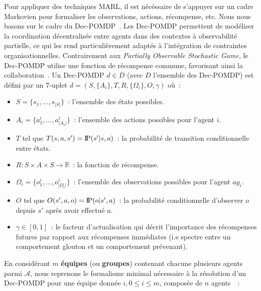 \documentclass[francais,ROIA,Unicode,manuscript]{cedram}
\newcommand{\probP}{\text{I\kern-0.15em P}}
\begin{document}
Pour appliquer des techniques MARL, il est nécéssaire de s'appuyer sur un cadre Markovien pour formaliser les observations, actions, récompense, etc. Nous nous basons sur le cadre du Dec-POMDP~\cite{Oliehoek2016}. Les Dec-POMDP permettent de modéliser la coordination décentralisée entre agents dans des contextes à observabilité partielle, ce qui les rend particulièrement adaptés à l'intégration de contraintes organisationnelles. Contrairement aux \textit{Partially Observable Stochastic Game}, le Dec-POMDP utilise une fonction de récompense commune, favorisant ainsi la collaboration~\cite{Beynier2013}.
Un Dec-POMDP $d \in D$ (avec $D$ l'ensemble des Dec-POMDP) est défini par un 7-uplet $d = (S,\{A_i\},T,R,\{\Omega_i\},O,\gamma)$ où~:
\begin{itemize}
    \item $S = \{s_1, ..., s_{|S|}\}$~: l'ensemble des états possibles.
    \item $A_i = \{a_1^i, ..., a_{|A_i|}^i\}$~: l'ensemble des actions possibles pour l'agent $i$.
    \item $T$ tel que $T(s,a,s') = \probP(s'|s,a)$~: la probabilité de transition conditionnelle entre états.
    \item $R: S \times A \times S \rightarrow \mathbb{R}$~: la fonction de récompense.
    \item $\Omega_i = \{o_1^i, ..., o_{|\Omega_i|}^i\}$~: l'ensemble des observations possibles pour l'agent $ag_i$.
    \item $O$ tel que $O(s',a,o) = \probP(o|s',a)$~: la probabilité conditionnelle d'observer $o$ depuis $s'$ après avoir effectué $a$.
    \item $\gamma \in [0,1]$~: le facteur d'actualisation qui décrit l'importance des récompenses futures par rapport aux récompenses immédiates (i.e spectre entre un comportement glouton et un comportement prévenant).
\end{itemize}

En considérant $m$ \textbf{équipes} (ou \textbf{groupes}) contenant chacune plusieurs agents parmi $\mathcal{A}$, nous reprenons le formalisme minimal nécessaire à la résolution d'un Dec-POMDP pour une équipe donnée $i, 0 \leq i \leq m$, composée de $n$ agents~\cite{Beynier2013,Albrecht2024}~:
\end{document}
